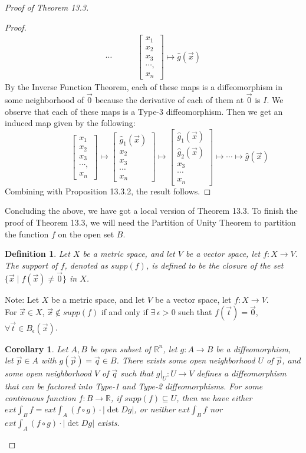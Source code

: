 \documentclass[15pt]{book}
\theoremstyle{break}
\theoremstyle{break}
\newtheorem{corT}[lem]{Corollary}
\newtheorem{defn}{Definition}[corL]
\newcommand{\R}{\mathbb{R}}
\newcommand{\bmat}[1]{\begin{bmatrix} #1 \end{bmatrix}}
\newcommand{\note}{\color{red}Note: \color{black}}
\begin{document}
\begin{proof}[Proof of Theorem 13.3]
\begin{proof}
\begin{align*}
\cdots \qquad\quad
\bmat{x_1\\x_2\\x_3\\\cdots,\\x_n} \mapsto \hat{g}(\vec{x})
\end{align*}
By the Inverse Function Theorem, each of these maps is a diffeomorphism in some neighborhood of $\vec{0}$ because the derivative of each of them at $\vec{0}$ is $I$. We observe that each of these maps is a Type-3 diffeomorphism. Then we get an induced map given by the following:
$$\qquad\qquad\bmat{x_1\\x_2\\x_3\\\cdots,\\x_n} \mapsto \bmat{\hat{g}_1(\vec{x})\\x_2\\x_3\\\cdots \\x_n} \mapsto \bmat{\hat{g}_1(\vec{x})\\\hat{g}_2(\vec{x})\\x_3\\\cdots\\ x_n} \mapsto
\cdots \mapsto \hat{g}(\vec{x})$$
Combining with Proposition 13.3.2, the result follows.
\end{proof}

Concluding the above, we have got a local version of Theorem 13.3. To finish the proof of Theorem 13.3, we will need the Partition of Unity Theorem to partition the function $f$ on the open set $B$.

\begin{defn}
Let $X$ be a metric space, and let $V$ be a vector space, let $f:X \to V$.
The support of $f$, denoted as $supp(f)$, is defined to be the closure of the set $\{\vec{x}\mid f(\vec{x}) \neq \vec{0}\}$ in $X$.
\end{defn}

\note Let $X$ be a metric space, and let $V$ be a vector space, let $f:X \to V$. \\For $\vec{x}\in X$, $\vec{x}\notin supp(f)$ if and only if $\exists\ \epsilon > 0$ such that $f(\vec{t}) = \vec{0}$, $\forall \vec{t}\in B_\epsilon(\vec{x})$. 

\begin{corT}\setlength{\leftskip}{1cm}
Let $A,B$ be open subset of $\R^n$, let $g:A \to B$ be a diffeomorphism, let $\vec{p}\in A$ with $g(\vec{p}) = \vec{q}\in B$. There exists some open neighborhood $U$ of $\vec{p}$, and some open neighborhood $V$ of $\vec{q}$ such that $g|_U:U \to V$ defines a diffeomorphism that can be factored into Type-1 and Type-2 diffeomorphisms. For some continuous function $f:B \to \R$, if $supp(f) \subseteq U$, then we have either $ext \int_B f = ext \int_A (f\circ g) \cdot |\det Dg|$, or neither $ext \int_B f$ nor $ext \int_A (f\circ g) \cdot |\det Dg|$ exists.
\end{corT}


\end{proof}
\end{document}

